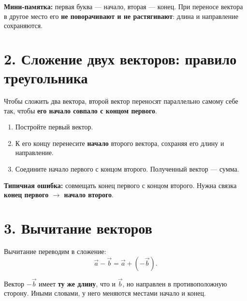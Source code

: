 \documentclass[a4paper,12pt]{article}
\newcommand{\key}[1]{\textbf{\color{darkaccent}#1}}
\newcommand{\mistake}[1]{\textbf{\color{warn}#1}}
\begin{document}
\key{Мини-памятка:} первая буква --- начало, вторая --- конец. При переносе вектора в другое место его \textbf{не поворачивают и не растягивают}: длина и направление сохраняются.

\section*{2. Сложение двух векторов: правило треугольника}
Чтобы сложить два вектора, второй вектор переносят параллельно самому себе так, чтобы \key{его начало совпало с концом первого}.

\begin{center}
\end{center}

\begin{enumerate}
  \item Постройте первый вектор.
  \item К его концу перенесите \textbf{начало} второго вектора, сохраняя его длину и направление.
  \item Соедините начало первого с концом второго. Полученный вектор --- сумма.
\end{enumerate}

\mistake{Типичная ошибка:} совмещать конец первого с концом второго. Нужна связка \textbf{конец первого $\to$ начало второго}.

\section*{3. Вычитание векторов}
Вычитание переводим в сложение:
\[
\vec a-\vec b=\vec a+(-\vec b).
\]

Вектор $-\vec b$ имеет \textbf{ту же длину}, что и $\vec b$, но направлен в противоположную сторону. Иными словами, у него меняются местами начало и конец.

\begin{center}
\end{center}
\end{document}
